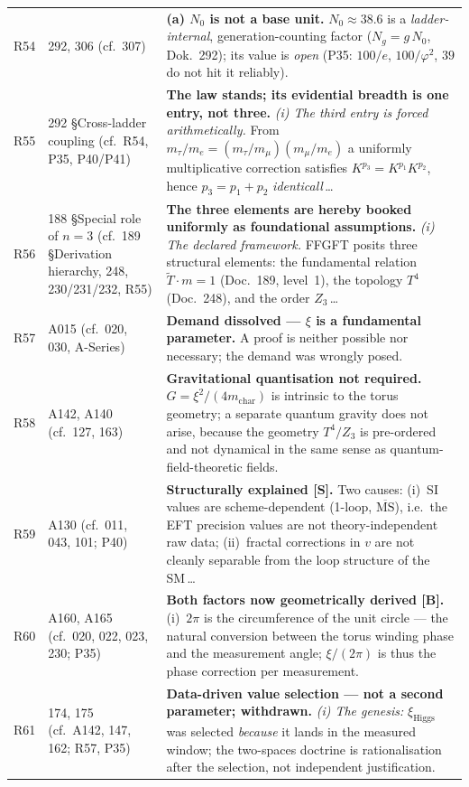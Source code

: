\begin{longtable}{@{}p{0.9cm}p{3.1cm}p{10.2cm}@{}}
R54 & 292, 306 (cf.\ 307) & \textbf{(a) $N_0$ is not a base unit.} $N_0\approx38.6$ is a \emph{ladder-internal}, generation-counting factor ($N_g=g\,N_0$, Dok.~292); its value is \emph{open} (P35: $100/e$, $100/\varphi^2$, $39$ do not hit it reliably). \\
R55 & 292 \S{}Cross-ladder coupling (cf.\ R54, P35, P40/P41) & \textbf{The law stands; its evidential breadth is one entry, not three.} \emph{(i) The third entry is forced arithmetically.} From $m_\tau/m_e=(m_\tau/m_\mu)(m_\mu/m_e)$ a uniformly multiplicative correction satisfies $K^{p_3}=K^{p_1}K^{p_2}$, hence $p_3=p_1+p_2$ \emph{identicall}\,\ldots \\
R56 & 188 \S{}Special role of $n=3$ (cf.\ 189 \S{}Derivation hierarchy, 248, 230/231/232, R55) & \textbf{The three elements are hereby booked uniformly as foundational assumptions.} \emph{(i) The declared framework.} FFGFT posits three structural elements: the fundamental relation $\tilde{T}\cdot m = 1$ (Doc.~189, level~1), the topology $T^4$ (Doc.~248), and the order $Z_3$\,\ldots \\
R57 & A015 (cf.\ 020, 030, A-Series) & \textbf{Demand dissolved --- $\xi$ is a fundamental parameter.} A proof is neither possible nor necessary; the demand was wrongly posed. \\
R58 & A142, A140 (cf.\ 127, 163) & \textbf{Gravitational quantisation not required.} $G=\xi^2/(4m_\text{char})$ is intrinsic to the torus geometry; a separate quantum gravity does not arise, because the geometry $T^4/Z_3$ is pre-ordered and not dynamical in the same sense as quantum-field-theoretic fields. \\
R59 & A130 (cf.\ 011, 043, 101; P40) & \textbf{Structurally explained [S].} Two causes: (i)~SI values are scheme-dependent (1-loop, $\overline{\mathrm{MS}}$), i.e.\ the EFT precision values are not theory-independent raw data; (ii)~fractal corrections in $v$ are not cleanly separable from the loop structure of the SM\,\ldots \\
R60 & A160, A165 (cf.\ 020, 022, 023, 230; P35) & \textbf{Both factors now geometrically derived [B].} (i)~$2\pi$ is the circumference of the unit circle --- the natural conversion between the torus winding phase and the measurement angle; $\xi/(2\pi)$ is thus the phase correction per measurement. \\
R61 & 174, 175 (cf.\ A142, 147, 162; R57, P35) & \textbf{Data-driven value selection --- not a second parameter; withdrawn.} \emph{(i) The genesis:} $\xi_\text{Higgs}$ was selected \emph{because} it lands in the measured window; the two-spaces doctrine is rationalisation after the selection, not independent justification. \\

\end{longtable}
